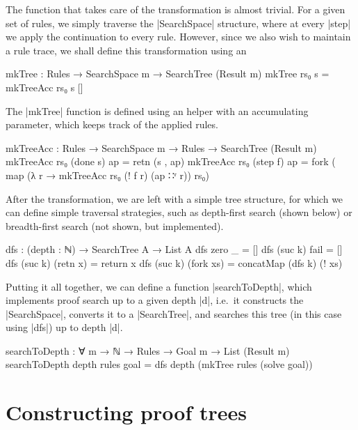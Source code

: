 \documentclass[preprint]{sigplanconf}
\begin{document}
The function that takes care of the transformation is almost
trivial. For a given set of rules, we simply traverse the
|SearchSpace| structure, where at every |step| we apply the
continuation to every rule. However, since we also wish to maintain a
rule trace, we shall define this transformation using an
\begin{code}
mkTree : Rules → SearchSpace m → SearchTree (Result m)
mkTree rs₀ s = mkTreeAcc rs₀ s []
\end{code}
The |mkTree| function is defined using an helper with an accumulating
parameter, which keeps track of the applied rules.

\begin{code}
mkTreeAcc : Rules → SearchSpace m → Rules → SearchTree (Result m)
mkTreeAcc rs₀ (done s)  ap  = retn (s , ap)
mkTreeAcc rs₀ (step f)  ap  =
  fork (~ map (λ r → mkTreeAcc rs₀ (! f r) (ap ∷ʳ r)) rs₀)
\end{code}

After the transformation, we are left with a simple tree structure,
for which we can define simple traversal strategies, such as
depth-first search (shown below) or breadth-first search (not shown,
but implemented).

\begin{code}
  dfs : (depth : ℕ) → SearchTree A → List A
  dfs  zero    _          = []
  dfs (suc k)  fail       = []
  dfs (suc k)  (retn x)   = return x
  dfs (suc k)  (fork xs)  = concatMap (dfs k) (! xs)
\end{code}

Putting it all together, we can define a function |searchToDepth|,
which implements proof search up to a given depth |d|, i.e.\ it
constructs the |SearchSpace|, converts it to a |SearchTree|, and
searches this tree (in this case using |dfs|) up to depth |d|.

\begin{code}
searchToDepth :
  ∀ {m} → ℕ → Rules → Goal m → List (Result m)
searchToDepth depth rules goal =
  dfs depth (mkTree rules (solve goal))
\end{code}



\section{Constructing proof trees}
\label{sec:proofs}
\end{document}
